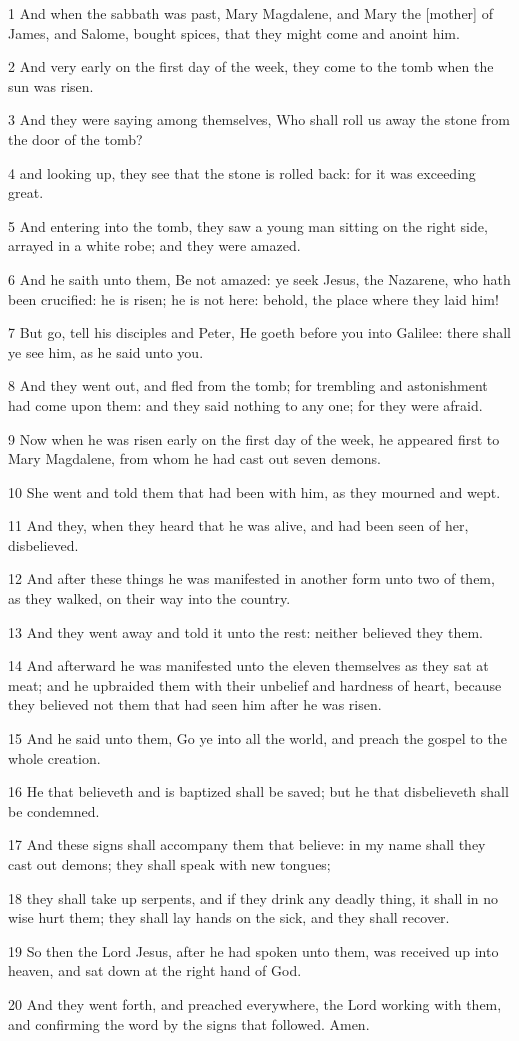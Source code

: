 \par 1 And when the sabbath was past, Mary Magdalene, and Mary the [mother] of James, and Salome, bought spices, that they might come and anoint him.
\par 2 And very early on the first day of the week, they come to the tomb when the sun was risen.
\par 3 And they were saying among themselves, Who shall roll us away the stone from the door of the tomb?
\par 4 and looking up, they see that the stone is rolled back: for it was exceeding great.
\par 5 And entering into the tomb, they saw a young man sitting on the right side, arrayed in a white robe; and they were amazed.
\par 6 And he saith unto them, Be not amazed: ye seek Jesus, the Nazarene, who hath been crucified: he is risen; he is not here: behold, the place where they laid him!
\par 7 But go, tell his disciples and Peter, He goeth before you into Galilee: there shall ye see him, as he said unto you.
\par 8 And they went out, and fled from the tomb; for trembling and astonishment had come upon them: and they said nothing to any one; for they were afraid.
\par 9 Now when he was risen early on the first day of the week, he appeared first to Mary Magdalene, from whom he had cast out seven demons.
\par 10 She went and told them that had been with him, as they mourned and wept.
\par 11 And they, when they heard that he was alive, and had been seen of her, disbelieved.
\par 12 And after these things he was manifested in another form unto two of them, as they walked, on their way into the country.
\par 13 And they went away and told it unto the rest: neither believed they them.
\par 14 And afterward he was manifested unto the eleven themselves as they sat at meat; and he upbraided them with their unbelief and hardness of heart, because they believed not them that had seen him after he was risen.
\par 15 And he said unto them, Go ye into all the world, and preach the gospel to the whole creation.
\par 16 He that believeth and is baptized shall be saved; but he that disbelieveth shall be condemned.
\par 17 And these signs shall accompany them that believe: in my name shall they cast out demons; they shall speak with new tongues;
\par 18 they shall take up serpents, and if they drink any deadly thing, it shall in no wise hurt them; they shall lay hands on the sick, and they shall recover.
\par 19 So then the Lord Jesus, after he had spoken unto them, was received up into heaven, and sat down at the right hand of God.
\par 20 And they went forth, and preached everywhere, the Lord working with them, and confirming the word by the signs that followed. Amen.

